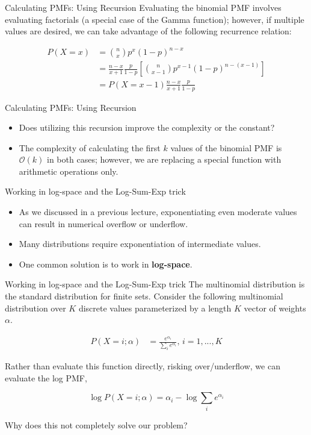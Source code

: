 \documentclass[serif,xcolor=pdftex,dvipsnames,table,hyperref={bookmarks=false,breaklinks}]{beamer}
\begin{document}
\begin{frame}[t]{Calculating PMFs: Using Recursion}
	Evaluating the binomial PMF involves evaluating factorials (a special case of the Gamma function); however, if multiple values are desired, we can take advantage of the following recurrence relation:

	\begin{align*}
		P(X=x) &= {{n}\choose{x}}p^x(1-p)^{n-x}\\
		&= \frac{n-x}{x+1}\frac{p}{1-p}\left[{{n}\choose{x-1}}p^{x-1}(1-p)^{n-(x-1)}\right]\\
		&= P(X=x-1)\frac{n-x}{x+1}\frac{p}{1-p}
	\end{align*}
\end{frame}

\begin{frame}[t]{Calculating PMFs: Using Recursion}
	\begin{itemize}[<+->]
		\item Does utilizing this recursion improve the complexity or the constant?
		\item The complexity of calculating the first $k$ values of the binomial PMF is $\mathcal{O}(k)$ in both cases; however, we are replacing a special function with arithmetic operations only.
	\end{itemize}
\end{frame}

\begin{frame}[t]{Working in log-space and the Log-Sum-Exp trick}
	\begin{itemize}[<+->]
		\item As we discussed in a previous lecture, exponentiating even moderate values can result in numerical overflow or underflow.
		\item Many distributions require exponentiation of intermediate values.
		\item One common solution is to work in \textbf{log-space}.
	\end{itemize}
	
\end{frame}


\begin{frame}[t]{Working in log-space and the Log-Sum-Exp trick}
	The multinomial distribution is the standard distribution for finite sets. Consider the following multinomial distribution over $K$ discrete values parameterized by a length $K$ vector of weights $\alpha$.
	
	\begin{align*}
		P(X=i; \alpha) &= \frac{e^{\alpha_i}}{\sum_i e^{\alpha_i}},\, i = 1,...,K
	\end{align*}
	
	\pause
	Rather than evaluate this function directly, risking over/underflow, we can evaluate the log PMF,
	
	$$\log P(X=i;\alpha) = \alpha_i - \log \sum_i e^{\alpha_i}$$
	
	\pause
	Why does this not completely solve our problem?
	
\end{frame}
\end{document}
